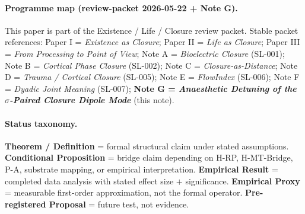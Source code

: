 \documentclass[11pt,a4paper]{article}
\begin{document}
\paragraph{Programme map (review-packet 2026-05-22 + Note G).}
This paper is part of the Existence / Life / Closure review packet.
Stable packet references: Paper I = \emph{Existence as Closure}; Paper II
= \emph{Life as Closure}; Paper III = \emph{From Processing to Point of
View}; Note A = \emph{Bioelectric Closure} (SL-001); Note B = \emph{Cortical
Phase Closure} (SL-002); Note C = \emph{Closure-as-Distance}; Note D =
\emph{Trauma / Cortical Closure} (SL-005); Note E = \emph{FlowIndex}
(SL-006); Note F = \emph{Dyadic Joint Meaning} (SL-007); \textbf{Note G =
\emph{Anaesthetic Detuning of the $\sigma$-Paired Closure Dipole Mode}}
(this note).

\bigskip

\noindent{}

\bigskip

\paragraph{Status taxonomy.}
\textbf{Theorem / Definition} = formal structural claim under stated
assumptions. \textbf{Conditional Proposition} = bridge claim depending on
H-RP, H-MT-Bridge, P-A, substrate mapping, or empirical interpretation.
\textbf{Empirical Result} = completed data analysis with stated effect
size $+$ significance. \textbf{Empirical Proxy} = measurable first-order
approximation, not the formal operator. \textbf{Pre-registered Proposal}
= future test, not evidence.
\end{document}

